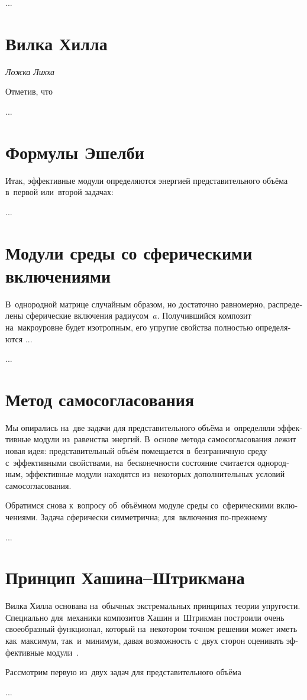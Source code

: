 \begin{otherlanguage}{russian}
...



\section{Вилка Хилла}

\emph{Ложка Лихха}

Отметив, что

...



\section{Формулы Эшелби}

Итак, эффективные модули определяются энергией представительного объёма в~первой или~второй задачах:

...



\section{Модули среды со сферическими включениями} %

В~однородной матрице случайным образом, но достаточно равномерно, распределены сферические включения радиусом~$a$. Получившийся композит на~макроуровне будет изотропным, его упругие свойства полностью определяются ...

...


\section{Метод самосогласования}

Мы опирались на~две задачи для представительного объёма и~определяли эффективные модули из~равенства энергий. В~\hbox{основе} метода самосогласования лежит новая идея: представительный объём помещается в~безграничную среду с~эффективными свойствами, на~бесконечности состояние считается однородным, эффективные модули находятся из~некоторых дополнительных условий самосогласования.

Обратимся снова к~вопросу об~объёмном модуле среды со~сферическими включениями. Задача сферически симметрична; для~включения по\hbox{-}прежнему

...


\section{Принцип Хашина\hbox{--}Штрикмана}

Вилка Хилла основана на~обычных экстремальных принципах теории упругости. Специально для~механики композитов Хашин и~Штрикман построили очень своеобразный функционал, который на~некотором точном решении может иметь как~максимум, так~и~минимум, давая возможность с~двух сторон оценивать эффективные модули~\cite{shermergor}.

Рассмотрим первую из~двух задач для представительного объёма

...



\end{otherlanguage}

